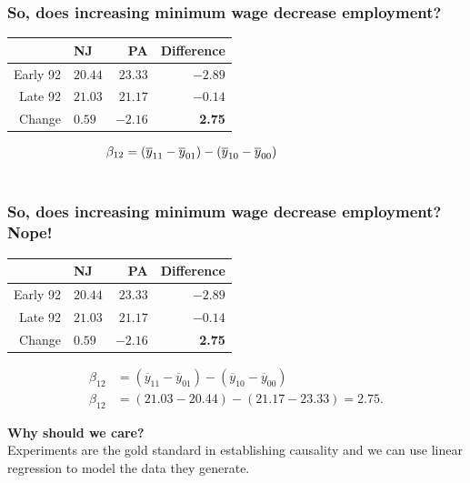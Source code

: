 \documentclass[aspectratio=169]{beamer}
\theoremstyle{principle}
\begin{document}
\begin{frame}
\frametitle{So, does increasing minimum wage decrease employment?  }

\begin{table}[ht]
\centering
\begin{tabular}{rlrr}
  \hline
  \hline
 & NJ & PA & Difference \\ 
  \hline
    \hline
Early 92 & $20.44$ & $23.33$ & $-2.89$ \\ 
Late 92 & $21.03$ & $21.17$ & $-0.14$ \\ 
Change & $0.59$ & $-2.16$ & \textbf{2.75} \\ 
   \hline
      \hline
\end{tabular}
\end{table}

\begin{align*}
\beta_{12} &= (\overline{y}_{11} - \overline{y}_{01}) - (\overline{y}_{10} - \overline{y}_{00})\\
\color{white}\beta_{12} &\color{white}= (21.03 - 20.44) - (21.17 - 23.33) = 2.75.
\end{align*}

\end{frame}

\begin{frame}
\frametitle{So, does increasing minimum wage decrease employment?  Nope!}

\begin{table}[ht]
\centering
\begin{tabular}{rlrr}
  \hline
  \hline
 & NJ & PA & Difference \\ 
  \hline
    \hline
Early 92 & $20.44$ & $23.33$ & $-2.89$ \\ 
Late 92 & $21.03$ & $21.17$ & $-0.14$ \\ 
Change & $0.59$ & $-2.16$ & \textbf{2.75} \\ 
   \hline
      \hline
\end{tabular}
\end{table}

\begin{align*}
\beta_{12} &= (\overline{y}_{11} - \overline{y}_{01}) - (\overline{y}_{10} - \overline{y}_{00})\\
\beta_{12}  &= (21.03 - 20.44) - (21.17 - 23.33) = 2.75.
\end{align*}

\end{frame}

\begin{frame}

\begin{center}
\Huge\textbf{Why should we care?}\\
\bigskip
\bigskip
\large Experiments are the gold standard in establishing causality and we can use linear regression to model the data they generate.\\
\end{center}

\end{frame}
\end{document}
